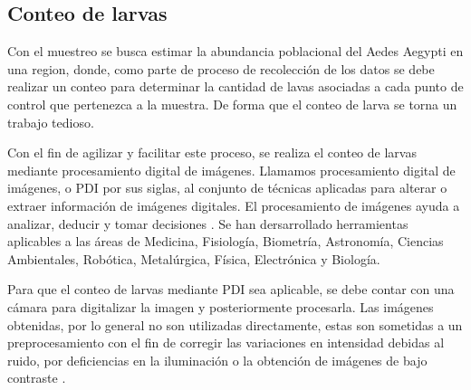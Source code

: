 \subsection{Conteo de larvas}
Con el muestreo se busca estimar la abundancia poblacional del Aedes Aegypti en una region, donde,
como parte de proceso de recolección de los datos se debe realizar un conteo para determinar la
cantidad de lavas asociadas a cada punto de control que pertenezca a la muestra. De forma que el
conteo de larva se torna un trabajo tedioso.

Con el fin de agilizar y facilitar este proceso, se realiza el conteo de larvas mediante
procesamiento digital de imágenes. Llamamos procesamiento digital de imágenes, o PDI por sus
siglas, al conjunto de técnicas aplicadas para alterar o extraer información de imágenes digitales.
El procesamiento de imágenes ayuda a analizar, deducir y tomar decisiones
\citep{ortiz2013procesamiento}. Se han dersarrollado herramientas aplicables a las áreas de
Medicina, Fisiología, Biometría, Astronomía, Ciencias Ambientales, Robótica, Metalúrgica, Física,
Electrónica y Biología.

Para que el conteo de larvas mediante PDI sea aplicable, se debe contar con una cámara para
digitalizar la imagen y posteriormente procesarla. Las imágenes obtenidas, por lo general no son
utilizadas directamente, estas son sometidas a un preprocesamiento con el fin de corregir las
variaciones en intensidad debidas al ruido, por deficiencias en la iluminación o la obtención de
imágenes de bajo contraste
\citep{santillan2008deteccion}.

